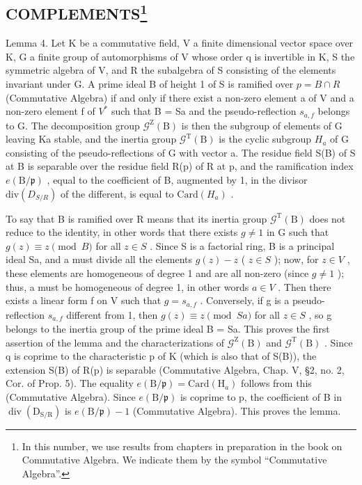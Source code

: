 \subsection[COMPLEMENTS]{COMPLEMENTS\footnote{In this number, we use results from chapters in preparation in the book on Commutative Algebra. We indicate them by the symbol ``Commutative Algebra''.}}

Lemma 4. Let K be a commutative field, V a finite dimensional vector space over K, G a finite group of automorphisms of V whose order q is invertible in K, S the symmetric algebra of V, and R the subalgebra of S consisting of the elements invariant under G. A prime ideal B of height 1 of S is ramified over \(p = B \cap R\) (Commutative Algebra) if and only if there exist a non-zero element a of V and a non-zero element f of \(V^{*}\) such that B = Sa and the pseudo-reflection \(s_{a,f}\) belongs to G. The decomposition group \(\mathcal{G}^{\mathrm{Z}}(\mathrm{B})\) is then the subgroup of elements of G leaving Ka stable, and the inertia group \(\mathcal{G}^{\mathrm{T}}(\mathrm{B})\) is the cyclic subgroup \(H_{a}\) of G consisting of the pseudo-reflections of G with vector a. The residue field S(B) of S at B is separable over the residue field R(p) of R at p, and the ramification index \(e(\mathrm{B}/\mathfrak{p})\) , equal to the coefficient of B, augmented by 1, in the divisor \(\text{div}(D_{S/R})\) of the different, is equal to \(\text{Card}(H_{a})\) .

To say that B is ramified over R means that its inertia group \(\mathcal{G}^{\mathrm{T}}(\mathrm{B})\) does not reduce to the identity, in other words that there exists \(g \neq 1\) in G such that \(g(z) \equiv z \pmod{B}\) for all \(z \in S\) . Since S is a factorial ring, B is a principal ideal Sa, and a must divide all the elements \(g(z) - z\) ( \(z \in S\) ); now, for \(z \in V\) , these elements are homogeneous of degree 1 and are all non-zero (since \(g \neq 1\) ); thus, a must be homogeneous of degree 1, in other words \(a \in V\) . Then there exists a linear form f on V such that \(g = s_{a,f}\) . Conversely, if g is a pseudo-reflection \(s_{a,f}\) different from 1, then \(g(z) \equiv z \pmod{Sa}\) for all \(z \in S\) , so g belongs to the inertia group of the prime ideal B = Sa. This proves the first assertion of the lemma and the characterizations of \(\mathcal{G}^{\mathrm{Z}}(\mathrm{B})\) and \(\mathcal{G}^{\mathrm{T}}(\mathrm{B})\) . Since q is coprime to the characteristic p of K (which is also that of S(B)), the extension S(B) of R(p) is separable (Commutative Algebra, Chap. V, §2, no. 2, Cor. of Prop. 5). The equality \(e(\mathrm{B}/\mathfrak{p}) = \mathrm{Card}(\mathrm{H}_{a})\) follows from this (Commutative Algebra). Since \(e(\mathrm{B}/\mathfrak{p})\) is coprime to p, the coefficient of B in \(\operatorname{div}(\mathrm{D}_{\mathrm{S/R}})\) is \(e(\mathrm{B}/\mathfrak{p}) - 1\) (Commutative Algebra). This proves the lemma.

